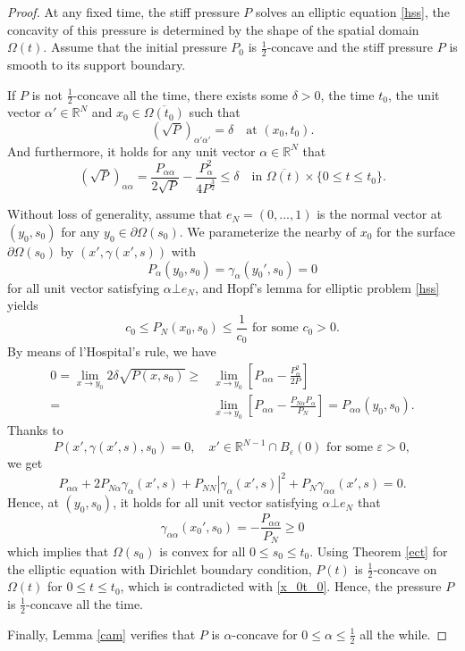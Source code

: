 \documentclass[10pt]{article}         %
\numberwithin{equation}{section}
\begin{document}
\begin{proof}At any fixed time, the stiff pressure $P$ solves an elliptic equation \eqref{hss}, the concavity of this pressure is determined by the shape of the spatial domain $\Omega(t)$. %
Assume that the initial pressure $P_0$ is $\frac{1}{2}$-concave and the stiff pressure $P$ is smooth to its support boundary.


If $P$ is not $\frac{1}{2}$-concave all the time,  there exists some $\delta>0$, the time $t_0$,  the  unit vector $\alpha'\in\mathbb{R}^N$ and $x_0\in \overline{\Omega(t_0)}$ such that 
\begin{equation}\label{x_0t_0}(\sqrt{P})_{\alpha'\alpha'}=\delta\quad\text{at }(x_0,t_0).\end{equation}
And furthermore, it holds for any unit vector $\alpha\in\mathbb{R}^N$ that 
\begin{equation}\label{spb}(\sqrt{P})_{\alpha\alpha}=\frac{P_{\alpha\alpha}}{2\sqrt{P}}-\frac{P_\alpha^{2}}{4P^{\frac{3}{2}}}\leq \delta\quad \text{in }\overline{\Omega(t)}\times\{0\leq t\leq t_0\}.\end{equation}


Without loss of generality, assume that $e_N=(0,...,1)$ is the normal vector at $(y_0,s_0)$ for any $y_0\in\partial\Omega(s_0)$.  We parameterize the nearby of $x_0$ for the surface $\partial\Omega(s_0)$ by $(x',\gamma(x',s))$ with
\[P_{\alpha}(y_0,s_0)=\gamma_{\alpha}(y_0',s_0)=0 \] for all unit vector satisfying $\alpha\bot e_N$, 
and Hopf's lemma for elliptic problem \eqref{hss} yields 
\[c_0\leq P_N(x_0,s_0)\leq \frac{1}{c_0}\text{ for some }c_0>0. \]
By means of  l'Hospital's rule, we have
\begin{equation}\label{pii}
\begin{aligned}
0=\lim\limits_{x\to y_0}2\delta\sqrt{P(x,s_0)}\geq& \lim\limits_{x\to y_0}[P_{\alpha\alpha}-\frac{P_\alpha^2}{2P}]\\
=&\lim\limits_{x\to y_0}[P_{\alpha\alpha}-\frac{P_{N\alpha}P_\alpha}{P_N}] =P_{\alpha\alpha}(y_0,s_0).
\end{aligned}
\end{equation}
Thanks to
\[P(x',\gamma(x',s),s_0)=0,\quad x'\in\mathbb{R}^{N-1}\cap B_{\varepsilon}(0)\text{ for some }\varepsilon>0,\]
we get 
\[P_{\alpha\alpha}+2P_{N\alpha}\gamma_\alpha(x',s)+P_{NN}|\gamma_\alpha(x',s)|^2+P_N\gamma_{\alpha\alpha}(x',s)=0.
\]
Hence, at $(y_0,s_0)$, it holds for all unit vector satisfying $\alpha\bot e_N$ that 
\[\gamma_{\alpha\alpha}(x_0',s_0)=-\frac{P_{\alpha\alpha}}{P_N}\geq 0\]
which implies that $\Omega(s_0)$ is convex for all $0\leq s_0\leq t_0$. Using Theorem \ref{ect} for the elliptic equation with Dirichlet boundary condition, $P(t)$ is $\frac{1}{2}$-concave on $\Omega(t)$ for $0\leq t\leq t_0$, which is contradicted with \eqref{x_0t_0}.  Hence, the pressure $P$ is $\frac{1}{2}$-concave all the time.


Finally, Lemma \ref{cam} verifies that $P$ is $\alpha$-concave for $0\leq \alpha\leq \frac{1}{2}$ all the while.
\end{proof}
\end{document}
